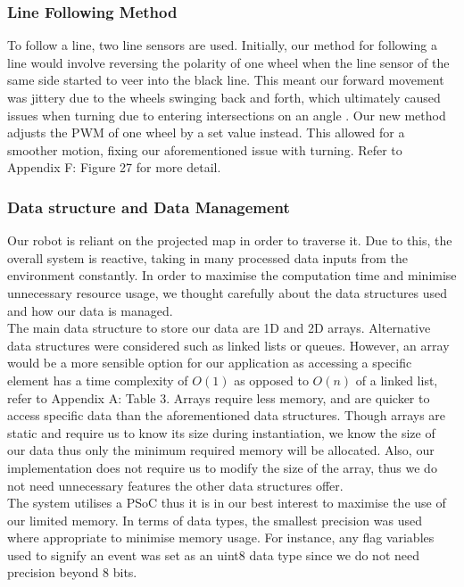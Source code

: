 \subsubsection*{Line Following Method}
To follow a line, two line sensors are used. Initially, our method for following a line would involve reversing the polarity of one wheel when the line sensor of the same side started to veer into the black line. This meant our forward movement was jittery due to the wheels swinging back and forth, which ultimately caused issues when turning due to entering intersections on an angle . Our new method adjusts the PWM of one wheel by a set value instead. This allowed for a smoother motion, fixing our aforementioned issue with turning. Refer to Appendix F: Figure 27 for more detail.

\subsubsection*{Data structure and Data Management}
Our robot is reliant on the projected map in order to traverse it. Due to this, the overall system is reactive, taking in many processed data inputs from the environment constantly. In order to maximise the computation time and minimise unnecessary resource usage, we thought carefully about the data structures used and  how our data is managed.
\\The main data structure to store our data are 1D and 2D arrays. Alternative data structures were considered such as linked lists or queues. However, an array would be a more sensible option for our application as accessing a specific element has a time complexity of $O(1)$ as opposed to $O(n)$ of a linked list, refer to Appendix A: Table 3. Arrays require less memory, and are quicker to access specific data than the aforementioned data structures. Though arrays are static and require us to know its size during instantiation, we know the size of our data thus only the minimum required memory will be allocated. Also, our implementation does not require us to modify the size of the array, thus we do not need unnecessary features the other data structures offer.
\\The system utilises a PSoC thus it is in our best interest to maximise the use of our limited memory. In terms of data types, the smallest precision was used where appropriate to minimise memory usage. For instance, any flag variables used to signify an event was set as an uint8 data type since we do not need precision beyond 8 bits.


